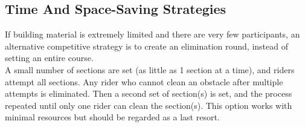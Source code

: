 \subsection{Time And Space-Saving Strategies}
If building material is extremely limited and there are very few participants, an alternative competitive strategy is to
create an elimination round, instead of setting an entire course.\\
A small number of sections are set (as little as 1 section at a time), and riders attempt all sections. Any rider who
cannot clean an obstacle after multiple attempts is eliminated. Then a second set of section(s) is set, and the process
repeated until only one rider can clean the section(s). This option works with minimal resources but should be regarded
as a last resort.
